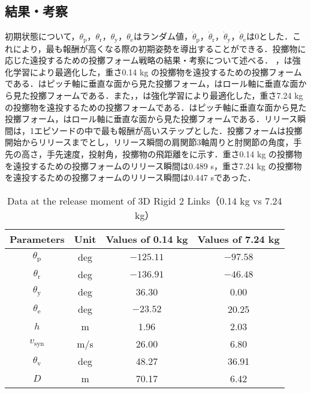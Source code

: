 \subsection{結果・考察}
初期状態について，$\theta_{\mathrm{p}}$，$\theta_{\mathrm{r}}$，$\theta_{\mathrm{y}}$，$\theta_{\mathrm{e}}$はランダム値，$\dot{\theta}_{\mathrm{p}}$，$\dot{\theta}_{\mathrm{r}}$，$\dot{\theta}_{\mathrm{y}}$，$\dot{\theta}_{\mathrm{e}}$は0とした．これにより，最も報酬が高くなる際の初期姿勢を導出することができる．投擲物に応じた遠投するための投擲フォーム戦略の結果・考察について述べる．
，は強化学習により最適化した，重さ0.14 kg の投擲物を遠投するための投擲フォームである．はピッチ軸に垂直な面から見た投擲フォーム，はロール軸に垂直な面から見た投擲フォームである．また，，は強化学習により最適化した，重さ7.24 kg の投擲物を遠投するための投擲フォームである．はピッチ軸に垂直な面から見た投擲フォーム，はロール軸に垂直な面から見た投擲フォームである．リリース瞬間は，1エピソードの中で最も報酬が高いステップとした．投擲フォームは投擲開始からリリースまでとし，リリース瞬間の肩関節3軸周りと肘関節の角度，手先の高さ，手先速度，投射角，投擲物の飛距離をに示す．重さ0.14 kg の投擲物を遠投するための投擲フォームのリリース瞬間は0.489 s，重さ7.24 kg の投擲物を遠投するための投擲フォームのリリース瞬間は0.447 sであった．

\begin{table}[tb]
  \begin{center}
    \caption{Data at the release moment of 3D Rigid 2 Links（0.14 kg vs 7.24 kg）}
    \begin{tabular}{c|c|c|c}
      \hline
      Parameters & Unit & Values of 0.14 kg & Values of 7.24 kg \\
      \hline
      $\theta_{\mathrm{p}}$ & deg & $-125.11$ & $-97.58$ \\
      $\theta_{\mathrm{r}}$ & deg & $-136.91$ & $-46.48$ \\
      $\theta_{\mathrm{y}}$ & deg  & 36.30 & 0.00 \\
      $\theta_{\mathrm{e}}$ & deg & $-23.52$ & 20.25 \\
      $h$ & m & 1.96 & 2.03 \\
      $v_{\mathrm{syn}}$ & m/s & 26.00 & 6.80 \\
      $\theta_{\mathrm{v}}$ & deg & 48.27 & 36.91 \\
      $D$ & m & 70.17 & 6.42 \\
      \hline
    \end{tabular}
  \end{center}
\end{table}

